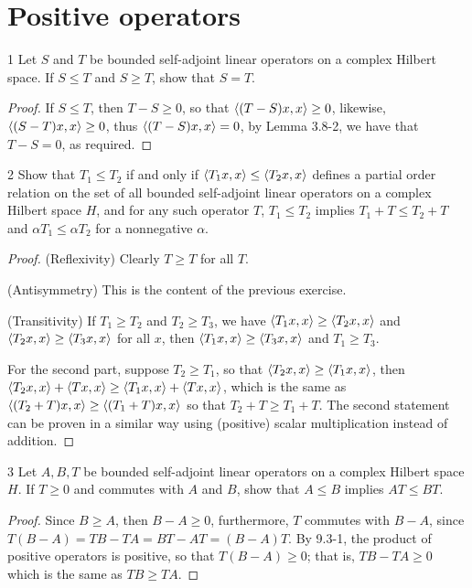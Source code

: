 \section{Positive operators}


\begin{exercise}{1}
Let $S$ and $T$ be bounded self-adjoint linear operators on a complex Hilbert space.
If $S \leq T$ and $S \geq T$, show that $S = T$.
\end{exercise}
\begin{proof}
If $S \leq T$, then $T - S \geq 0$, so that $\langle (T - S)x, x\rangle \geq 0$, likewise, $\langle (S -T) x, x\rangle  \geq 0$, thus $\langle (T - S) x, x\rangle = 0$, by Lemma 3.8-2, we have that $T - S = 0$, as required.
\end{proof} 

\begin{exercise}{2}
Show that $T_1 \leq T_2$ if and only if $\langle T_1 x, x\rangle \leq \langle T_2 x, x\rangle$ defines a partial order relation on the set of all bounded self-adjoint linear operators on a complex Hilbert space $H$, and for any such operator $T$, $T_1 \leq T_2$ implies $T_1 + T \leq T_2 + T$ and $\alpha T_1 \leq \alpha T_2$ for a nonnegative $\alpha$.
\end{exercise}
\begin{proof}
(Reflexivity) Clearly $T \geq T$ for all $T$.

(Antisymmetry) This is the content of the previous exercise.

(Transitivity) If $T_1 \geq T_2$ and $T_2 \geq T_3$, we have $\langle T_1 x, x\rangle \geq \langle T_2 x, x\rangle$ and $\langle T_2 x, x\rangle \geq \langle T_3 x, x\rangle$ for all $x$, then $\langle T_1 x, x\rangle \geq \langle T_3 x, x\rangle$ and $T_1 \geq T_3$.

For the second part, suppose $T_2 \geq T_1$, so that $\langle T_2 x, x\rangle \geq \langle T_1 x, x\rangle$, then $\langle T_2 x, x\rangle + \langle Tx, x\rangle \geq \langle T_1 x, x\rangle + \langle Tx, x\rangle$, which is the same as $\langle (T_2 + T) x, x\rangle \geq \langle (T_1 + T) x, x\rangle$ so that $T_2 + T \geq T_1 + T$.
The second statement can be proven in a similar way using (positive) scalar multiplication instead of addition.
\end{proof} 

\begin{exercise}{3}
Let $A, B, T$ be bounded self-adjoint linear operators on a complex Hilbert space $H$.
If $T \geq 0$ and commutes with $A$ and $B$, show that $A \leq B$ implies $AT \leq BT$.
\end{exercise}
\begin{proof}
Since $B \geq A$, then $B - A \geq 0$, furthermore, $T$ commutes with $B - A$, since $T(B - A) = TB - TA = BT - AT = (B - A)T$.
By 9.3-1, the product of positive operators is positive, so that $T(B - A) \geq 0$;
that is, $TB - TA \geq 0$ which is the same as $TB \geq TA$.
\end{proof} 

